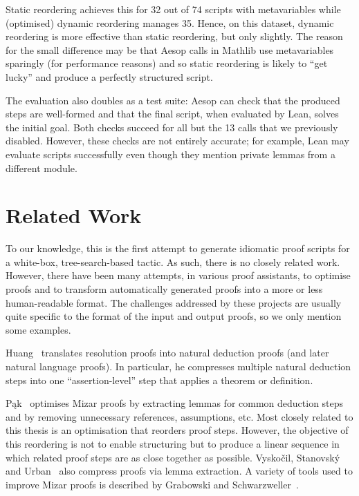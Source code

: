 Static reordering achieves this for 32 out of 74 scripts with metavariables while (optimised) dynamic reordering manages 35.
Hence, on this dataset, dynamic reordering is more effective than static reordering, but only slightly.
The reason for the small difference may be that Aesop calls in Mathlib use metavariables sparingly (for performance reasons) and so static reordering is likely to \enquote{get lucky} and produce a perfectly structured script.

\medskip

The evaluation also doubles as a test suite: Aesop can check that the produced steps are well-formed and that the final script, when evaluated by Lean, solves the initial goal.
Both checks succeed for all but the 13 calls that we previously disabled.
However, these checks are not entirely accurate; for example, Lean may evaluate scripts successfully even though they mention private lemmas from a different module.

\section{Related Work}%
\label{sec:script:related}

To our knowledge, this is the first attempt to generate idiomatic proof scripts for a white-box, tree-search-based tactic.
As such, there is no closely related work.
However, there have been many attempts, in various proof assistants, to optimise proofs and to transform automatically generated proofs into a more or less human-readable format.
The challenges addressed by these projects are usually quite specific to the format of the input and output proofs, so we only mention some examples.

Huang~\cite{Huang1989,Huang1994,Huang1996} translates resolution proofs into natural deduction proofs (and later natural language proofs).
In particular, he compresses multiple natural deduction steps into one \enquote{assertion-level} step that applies a theorem or definition.

Pąk~\cite{Pak2015,Pak2014a,Pak2014b,Pak2013,Pak2010} optimises Mizar proofs by extracting lemmas for common deduction steps and by removing unnecessary references, assumptions, etc.
Most closely related to this thesis is an optimisation that reorders proof steps.
However, the objective of this reordering is not to enable structuring but to produce a linear sequence in which related proof steps are as close together as possible.
Vyskočil, Stanovský and Urban~\cite{Vyskovil2010} also compress proofs via lemma extraction.
A variety of tools used to improve Mizar proofs is described by Grabowski and Schwarzweller~\cite{Grabowski2009}.


